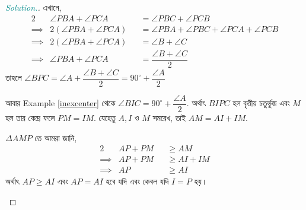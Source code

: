 \documentclass[a4paper,11pt]{article}
\newcommand{\drg}{^{\circ}}
\newenvironment{sltn}{\begin{proof}[\emph{\textcolor{darkcyan}{Solution.}}]} {\end{proof}}
\begin{document}
\begin{sltn}
	এখানে, 
	\begin{alignat*}{2}
		         & \angle PBA+\angle PCA    &  & =\angle PBC+\angle PCB                       \\
		\implies & 2(\angle PBA+\angle PCA) &  & =\angle PBA+\angle PBC+\angle PCA+\angle PCB \\
		\implies & 2(\angle PBA+\angle PCA) &  & =\angle B+\angle C                           \\
		\implies & \angle PBA+\angle PCA    &  & =\dfrac{\angle B+\angle C}{2}
	\end{alignat*}
	তাহলে $\angle BPC=\angle A+\dfrac{\angle B+\angle C}{2}=90\drg+\dfrac{\angle A}{2}$
	
	আবার Example \ref{inexcenter} থেকে $\angle BIC=90\drg+\dfrac{\angle A}{2}$. অর্থাৎ $BIPC$ হল বৃত্তীয় চতুর্ভুজ এবং $M$ হল তার কেন্দ্র ফলে $PM=IM$. যেহেতু $A,I$ ও $M$ সমরেখ, তাই $AM=AI+IM$. 
	
	$\Delta AMP$ তে আমরা জানি, 
	\begin{alignat*}{2}
		         & AP+PM &  & \geq AM    \\
		\implies & AP+PM &  & \geq AI+IM \\
		\implies & AP    &  & \geq AI
	\end{alignat*}
	অর্থাৎ $AP\geq AI$ এবং $AP=AI$ হবে যদি এবং কেবল যদি $I=P$ হয়। 
	\begin{center}
	\end{center}
\end{sltn}
\end{document}
